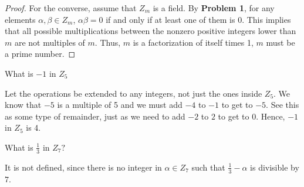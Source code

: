 \documentclass[12pt]{article}
\newenvironment{problem}[2][Problem]{\begin{trivlist} \item[\hskip \labelsep {\bfseries #1}\hskip \labelsep {\bfseries #2.}]}{\end{trivlist}}
\newenvironment{solution}[1][Solution]{\begin{trivlist} \item[\hskip \labelsep {\bfseries #1}]}{\end{trivlist}}
\begin{document}
\begin{problem}{2}
\begin{enumerate}
\begin{proof}
For the converse, assume that $Z_{m}$ is a field. By \textbf{Problem 1}, for any elements $\alpha,\beta\in Z_{m}$, $\alpha\beta = 0$ if and only if at least one of them is $0$. This implies that all possible multiplications between the nonzero positive integers lower than $m$ are not multiples of $m$. Thus, $m$ is a factorization of itself times 1, $m$ must be a prime number.
\end{proof}
  \item What is $-1$ in $Z_{5}$
\begin{solution}
  Let the operations be extended to any integers, not just the ones inside $Z_{5}$. We know that $-5$ is a multiple of 5 and we must add $-4$ to $-1$ to get to $-5$. See this as some type of remainder, just as we need to add $-2$ to $2$ to get to $0$. Hence, $-1$ in $Z_{5}$ is 4.
\end{solution}
  \item What is $\frac{1}{3}$ in $Z_{7}?$
\begin{solution}
  It is not defined, since there is no integer in $\alpha\in Z_{7}$ such that $\frac{1}{3}-\alpha$ is divisible by $7$. 
\end{solution}
\end{enumerate}
\end{problem}
\end{document}
